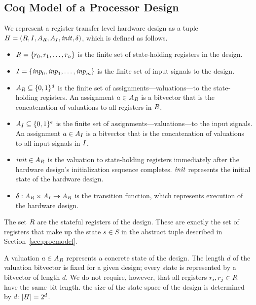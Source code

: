\subsection{Coq Model of a Processor Design}
We represent a register transfer level hardware design as a tuple $H =
(R,I,A_{R},A_{I},\mathit{init},\delta)$, which is defined as
follows.
\begin{itemize}
\item $R = \{r_0,r_1,\ldots,r_n\}$ is the finite set of state-holding
  registers in the design.
\item $I = \{\mathit{inp}_0, \mathit{inp}_1, \ldots,
  \mathit{inp}_m\}$ is the finite set of input signals to the design.
\item $A_{R} \subseteq \{0,1\}^d$
  is the finite set of assignments---valuations---to the state-holding registers. An assignment $a \in A_{R}$ is a bitvector that is the
  concatenation of valuations to all registers in $R$.
\item $A_{I} \subseteq \{0,1\}^e$ is the finite set of
  assignments---valuations---to the input signals. An assignment $a
  \in A_{I}$ is a bitvector that is the concatenation of
  valuations to all input signals in $I$.
\item $\mathit{init} \in A_{R}$ is the valuation to state-holding
  registers immediately after the hardware design's initialization sequence
  completes. $\mathit{init}$ represents the initial state of the hardware
  design.
\item $\delta: A_{R} \times
  A_{I} \rightarrow A_{R}$ is the
  transition function, which represents execution of the hardware
  design. 
\end{itemize}

The set $R$ are the stateful registers of the design. These are exactly
the set of registers that make up the state $s \in S$ in the abstract tuple
described in Section~\ref{sec:procmodel}.

A valuation $a \in A_{R}$ represents a concrete
state of the design. The length $d$ of the valuation bitvector is fixed for a
given design; every state is represented by a bitvector of length $d$. We do not
require, however, that all registers $r_i, r_j \in R$ have the same bit
length. the size of the state space of the design is determined by $d$:
$|H| = 2^d$.

